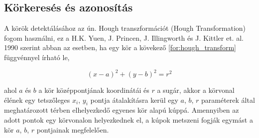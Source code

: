 \subsection{Körkeresés és azonosítás}
A körök detektálásához az ún. Hough transzformációt (Hough Transformation) fogom használni, ez a H.K. Yuen, J. Princen, J. Illingworth és J. Kittler et. al. 1990 \cite{YUEN199071} szerint abban az esetben, ha egy kör a kövekező \ref{for:hough_transform} függvénnyel írható le,

\begin{equation}
    (x - a)^2 + (y - b)^2 = r^2
    \label{for:hough_transform}
\end{equation}

\par ahol $a$ és $b$ a kör középpontjának koordinátái és $r$ a sugár, akkor a körvonal élének egy tetszőleges $x_i$, $y_i$ pontja átalakításra kerül egy $a$, $b$, $r$ paraméterek által meghatározott térben elhelyezkedő egyenes kör alapú kúppá.\cite{hough_transform,YUEN199071} Amennyiben az adott pontok egy körvonalon helyezkednek el, a kúpok metszeni fogják egymást a kör $a$, $b$, $r$ pontjainak megfelelően.\cite{YUEN199071}